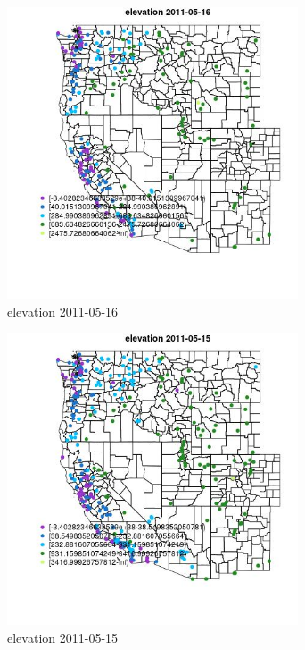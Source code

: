 \begin{figure} 
\centering  
\includegraphics[width=0.77\textwidth]{Code_Outputs/ML_input_report_ML_input_PM25_Step5_part_d_de_duplicated_aves_ML_input_MapObselevation2011-05-16.jpg} 
\caption{\label{fig:ML_input_report_ML_input_PM25_Step5_part_d_de_duplicated_aves_ML_inputMapObselevation2011-05-16}elevation 2011-05-16} 
\end{figure} 
 

\begin{figure} 
\centering  
\includegraphics[width=0.77\textwidth]{Code_Outputs/ML_input_report_ML_input_PM25_Step5_part_d_de_duplicated_aves_ML_input_MapObselevation2011-05-15.jpg} 
\caption{\label{fig:ML_input_report_ML_input_PM25_Step5_part_d_de_duplicated_aves_ML_inputMapObselevation2011-05-15}elevation 2011-05-15} 
\end{figure} 
 

